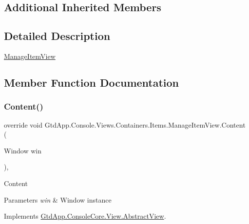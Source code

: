 \subsection*{Additional Inherited Members}


\subsection{Detailed Description}
\mbox{\hyperlink{class_gtd_app_1_1_console_1_1_views_1_1_containers_1_1_items_1_1_manage_item_view}{Manage\+Item\+View}} 



\subsection{Member Function Documentation}
\mbox{\label{class_gtd_app_1_1_console_1_1_views_1_1_containers_1_1_items_1_1_manage_item_view_a4b066141a958d2dc737722d5c6e2b3c6}} 
\subsubsection{\texorpdfstring{Content()}{Content()}}
{\footnotesize\ttfamily override void Gtd\+App.\+Console.\+Views.\+Containers.\+Items.\+Manage\+Item\+View.\+Content (\begin{DoxyParamCaption}\item[{Window}]{win }\end{DoxyParamCaption})\hspace{0.3cm}{\ttfamily [protected]}, {\ttfamily [virtual]}}



Content 


\begin{DoxyParams}{Parameters}
{\em win} & Window instance\\
\hline
\end{DoxyParams}


Implements \mbox{\hyperlink{class_gtd_app_1_1_console_core_1_1_view_1_1_abstract_view_a8c518373e635d19875713f2b9f2e1592}{Gtd\+App.\+Console\+Core.\+View.\+Abstract\+View}}.

